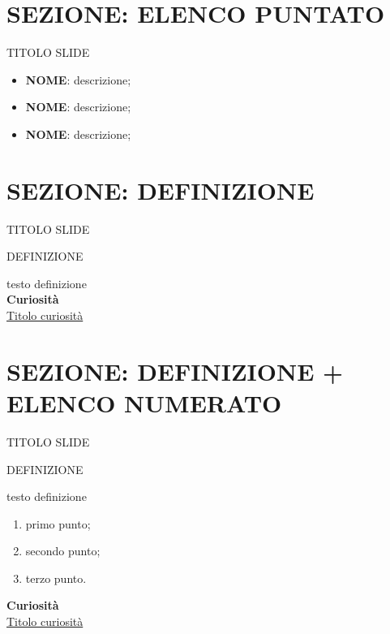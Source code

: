 \documentclass[aspectratio=1610]{beamer}
\begin{document}
\section{SEZIONE: ELENCO PUNTATO}

\begin{frame}{TITOLO SLIDE}
    \begin{itemize}
        \item \textbf{NOME}: descrizione;
        \pause
        \item \textbf{NOME}: descrizione;
        \pause
        \item \textbf{NOME}: descrizione;
    \end{itemize}
\end{frame}

\section{SEZIONE: DEFINIZIONE}

\begin{frame}{TITOLO SLIDE}
    \begin{alertblock}{DEFINIZIONE}
        \begin{minipage}{0.98\linewidth}
            \justifying
            testo definizione\\
            \bigskip
            \tiny{\textbf{Curiosità}}\\
            \tiny{\href{www.link.com}{Titolo curiosità}}
        \end{minipage}
    \end{alertblock}
\end{frame}

\section{SEZIONE: DEFINIZIONE + ELENCO NUMERATO}

\begin{frame}{TITOLO SLIDE}
    \begin{alertblock}{DEFINIZIONE}
        \begin{minipage}{0.98\linewidth}
            \justifying
            testo definizione\\
            \bigskip
            \begin{enumerate}
                \pause
                \item primo punto;
                \pause
                \item secondo punto;
                \pause
                \item terzo punto. 
            \end{enumerate}
            \bigskip
            \tiny{\textbf{Curiosità}}\\
            \tiny{\href{www.link.com}{Titolo curiosità}}        
        \end{minipage}
    \end{alertblock}
\end{frame}
\end{document}
